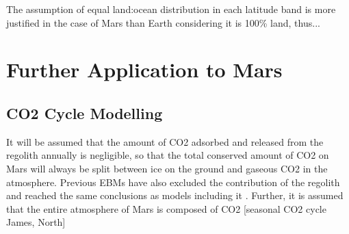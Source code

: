 \documentclass[12pt,onecolumn]{revtex4-2}    %
\begin{document}
The assumption of equal land:ocean distribution in each latitude band is more justified in the case of Mars than Earth considering it is 100\% land, thus...


\section{Further Application to Mars}
\subsection{CO2 Cycle Modelling}

It will be assumed that the amount of CO2 adsorbed and released from the regolith annually is negligible, so that the total conserved amount of CO2 on Mars will always be split between ice on the ground and gaseous CO2 in the atmosphere. Previous EBMs have also excluded the contribution of the regolith and reached the same conclusions as models including it \cite{NT01}. %
Further, it is assumed that the entire atmosphere of Mars is composed of CO2 [seasonal CO2 cycle James, North]
\begin{acknowledgments}
\end{acknowledgments}
\end{document}
